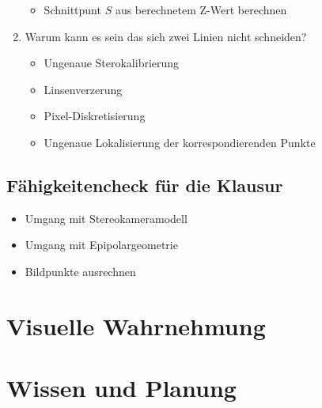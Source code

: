 \begin{enumerate}
\begin{itemize}
		\item Schnittpunt $S$ aus berechnetem Z-Wert berechnen
	\end{itemize}
  \item Warum kann es sein das sich zwei Linien nicht schneiden?
	\begin{itemize}
		\item Ungenaue Sterokalibrierung
		\item Linsenverzerung
		\item Pixel-Diskretisierung
		\item Ungenaue Lokalisierung der korrespondierenden Punkte
	\end{itemize}
\end{enumerate}

\subsection{Fähigkeitencheck für die Klausur}
\begin{itemize}
	\item Umgang mit Stereokameramodell %
	\item Umgang mit Epipolargeometrie %
	\item Bildpunkte ausrechnen
\end{itemize}
\section{Visuelle Wahrnehmung}
\section{Wissen und Planung}

